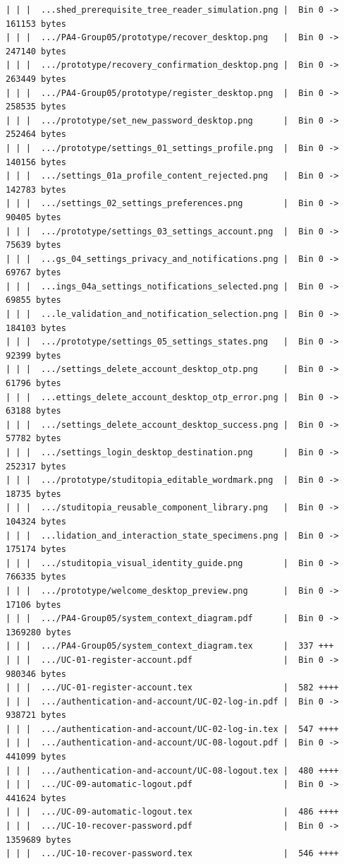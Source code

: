 \documentclass[12pt]{article}
\begin{document}
\begin{lstlisting}[numbers=none,breaklines=true]
| | |  ...shed_prerequisite_tree_reader_simulation.png |  Bin 0 -> 161153 bytes
| | |  .../PA4-Group05/prototype/recover_desktop.png   |  Bin 0 -> 247140 bytes
| | |  .../prototype/recovery_confirmation_desktop.png |  Bin 0 -> 263449 bytes
| | |  .../PA4-Group05/prototype/register_desktop.png  |  Bin 0 -> 258535 bytes
| | |  .../prototype/set_new_password_desktop.png      |  Bin 0 -> 252464 bytes
| | |  .../prototype/settings_01_settings_profile.png  |  Bin 0 -> 140156 bytes
| | |  .../settings_01a_profile_content_rejected.png   |  Bin 0 -> 142783 bytes
| | |  .../settings_02_settings_preferences.png        |  Bin 0 -> 90405 bytes
| | |  .../prototype/settings_03_settings_account.png  |  Bin 0 -> 75639 bytes
| | |  ...gs_04_settings_privacy_and_notifications.png |  Bin 0 -> 69767 bytes
| | |  ...ings_04a_settings_notifications_selected.png |  Bin 0 -> 69855 bytes
| | |  ...le_validation_and_notification_selection.png |  Bin 0 -> 184103 bytes
| | |  .../prototype/settings_05_settings_states.png   |  Bin 0 -> 92399 bytes
| | |  .../settings_delete_account_desktop_otp.png     |  Bin 0 -> 61796 bytes
| | |  ...ettings_delete_account_desktop_otp_error.png |  Bin 0 -> 63188 bytes
| | |  .../settings_delete_account_desktop_success.png |  Bin 0 -> 57782 bytes
| | |  .../settings_login_desktop_destination.png      |  Bin 0 -> 252317 bytes
| | |  .../prototype/studitopia_editable_wordmark.png  |  Bin 0 -> 18735 bytes
| | |  .../studitopia_reusable_component_library.png   |  Bin 0 -> 104324 bytes
| | |  ...lidation_and_interaction_state_specimens.png |  Bin 0 -> 175174 bytes
| | |  .../studitopia_visual_identity_guide.png        |  Bin 0 -> 766335 bytes
| | |  .../prototype/welcome_desktop_preview.png       |  Bin 0 -> 17106 bytes
| | |  .../PA4-Group05/system_context_diagram.pdf      |  Bin 0 -> 1369280 bytes
| | |  .../PA4-Group05/system_context_diagram.tex      |  337 +++
| | |  .../UC-01-register-account.pdf                  |  Bin 0 -> 980346 bytes
| | |  .../UC-01-register-account.tex                  |  582 ++++
| | |  .../authentication-and-account/UC-02-log-in.pdf |  Bin 0 -> 938721 bytes
| | |  .../authentication-and-account/UC-02-log-in.tex |  547 ++++
| | |  .../authentication-and-account/UC-08-logout.pdf |  Bin 0 -> 441099 bytes
| | |  .../authentication-and-account/UC-08-logout.tex |  480 ++++
| | |  .../UC-09-automatic-logout.pdf                  |  Bin 0 -> 441624 bytes
| | |  .../UC-09-automatic-logout.tex                  |  486 ++++
| | |  .../UC-10-recover-password.pdf                  |  Bin 0 -> 1359689 bytes
| | |  .../UC-10-recover-password.tex                  |  546 ++++

\end{lstlisting}
\end{document}
